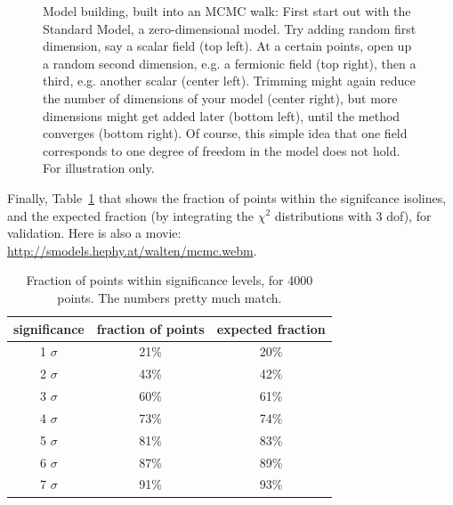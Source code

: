\documentclass[11pt,singleside,a4paper,makeidx,notitlepage]{article}
\begin{document}
\begin{figure}[h!t]
\begin{center}
\begin{tabular}{cc}
\end{tabular}
\caption{Model building, built into an MCMC walk: First start out with the
Standard Model, a zero-dimensional model. Try adding random first dimension,
say a scalar field (top
left). At a certain points, open up a random second dimension, e.g. a
fermionic field (top right),
then a third, e.g. another scalar (center left). Trimming might again reduce the number of
dimensions of your model (center right), but more dimensions might get added later
(bottom left), until the method converges (bottom right). Of course, this
simple idea that one field corresponds to one degree of freedom in the model
does not hold. For illustration only. }
\label{fig_models}
\end{center}
\end{figure}

Finally, Table~\ref{fractions} that shows the fraction 
of points within the signifcance isolines, and the expected fraction 
(by integrating the $\chi^2$ distributions with 3 dof),
for validation. Here is also a movie:\\
\href{http://smodels.hephy.at/walten/mcmc.webm}{http://smodels.hephy.at/walten/mcmc.webm}.

\begin{table}
\begin{tabular}{|c|c|c|}
\hline
	significance & fraction of points & expected fraction \\
\hline 
 1 $\sigma$  & 21\% & 20\% \\\hline
 2 $\sigma$  & 43\% & 42\% \\\hline
 3 $\sigma$  & 60\% & 61\% \\\hline
 4 $\sigma$  & 73\% & 74\% \\\hline
 5 $\sigma$  & 81\% & 83\% \\\hline
 6 $\sigma$  & 87\% & 89\% \\\hline
 7 $\sigma$  & 91\% & 93\% \\\hline
\end{tabular} 
\caption{Fraction of points within significance levels, for 4000 points. The
numbers pretty much match. }
\label{fractions}
\end{table}
\end{document}
